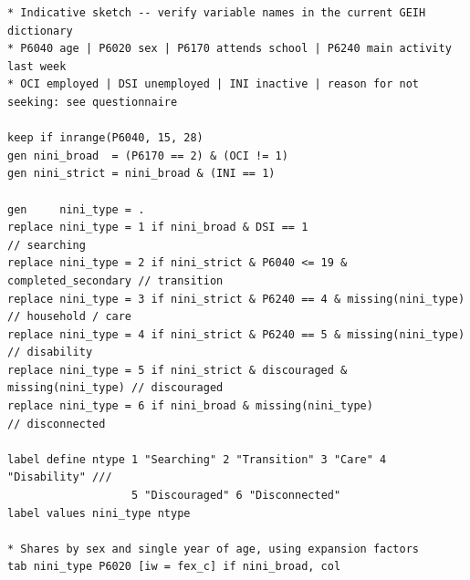 \documentclass[11pt]{article}
\begin{document}
\begin{lstlisting}[language={}]
* Indicative sketch -- verify variable names in the current GEIH dictionary
* P6040 age | P6020 sex | P6170 attends school | P6240 main activity last week
* OCI employed | DSI unemployed | INI inactive | reason for not seeking: see questionnaire

keep if inrange(P6040, 15, 28)
gen nini_broad  = (P6170 == 2) & (OCI != 1)
gen nini_strict = nini_broad & (INI == 1)

gen     nini_type = .
replace nini_type = 1 if nini_broad & DSI == 1                          // searching
replace nini_type = 2 if nini_strict & P6040 <= 19 & completed_secondary // transition
replace nini_type = 3 if nini_strict & P6240 == 4 & missing(nini_type)  // household / care
replace nini_type = 4 if nini_strict & P6240 == 5 & missing(nini_type)  // disability
replace nini_type = 5 if nini_strict & discouraged & missing(nini_type) // discouraged
replace nini_type = 6 if nini_broad & missing(nini_type)               // disconnected

label define ntype 1 "Searching" 2 "Transition" 3 "Care" 4 "Disability" ///
                   5 "Discouraged" 6 "Disconnected"
label values nini_type ntype

* Shares by sex and single year of age, using expansion factors
tab nini_type P6020 [iw = fex_c] if nini_broad, col
\end{lstlisting}

\newpage


\end{document}
